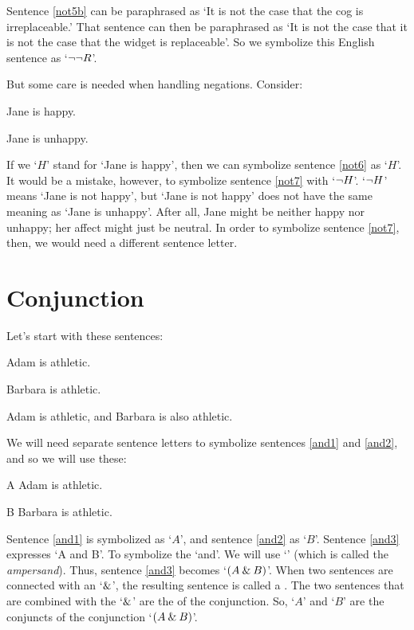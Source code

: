 Sentence \ref{not5b} can be paraphrased as `It is not the case that the cog is irreplaceable.' That sentence can then be paraphrased as `It is not the case that it is not the case that the widget is replaceable'. So we symbolize this English sentence as `${\neg}{\neg} R$'.

But some care is needed when handling negations. Consider:
	\begin{earg}
		\item[\ex{not6}] Jane is happy.
		\item[\ex{not7}] Jane is unhappy.
	\end{earg}
If we `$H$' stand for `Jane is happy', then we can symbolize sentence \ref{not6} as `$H$'. It would be a mistake, however, to symbolize sentence \ref{not7} with `${\neg}{H}$'. 
`${\neg}{H}$' means `Jane is not happy', but `Jane is not happy' does not have the same meaning as `Jane is unhappy'. After all, Jane might be neither happy nor unhappy; her affect might just be neutral. In order to symbolize sentence \ref{not7}, then, we would need a different sentence letter.


\section{Conjunction}
\label{s:ConnectiveConjunction}

Let's start with these sentences:
	\begin{earg}
		\item[\ex{and1}]Adam is athletic.
		\item[\ex{and2}]Barbara is athletic.
		\item[\ex{and3}]Adam is athletic, and Barbara is also athletic.
	\end{earg}
We will need separate sentence letters to symbolize sentences \ref{and1} and \ref{and2}, and so we will use these:
	\begin{ekey}
		\item[A] Adam is athletic.
		\item[B] Barbara is athletic.
	\end{ekey}
Sentence \ref{and1} is symbolized as `$A$', and sentence \ref{and2} as `$B$'. Sentence \ref{and3} expresses `A and B'. To symbolize the `and'. We will use `\eand' (which is called the \textit{ampersand}). Thus, sentence \ref{and3} becomes `$(A\mathbin{\&} B)$'. When two sentences are connected with an `$\mathbin{\&}$', the resulting sentence is called a . The two sentences that are combined with the `$\mathbin{\&}$' are the  of the conjunction. So, `$A$' and `$B$' are the conjuncts of the conjunction `$(A\mathbin{\&} B)$'.


